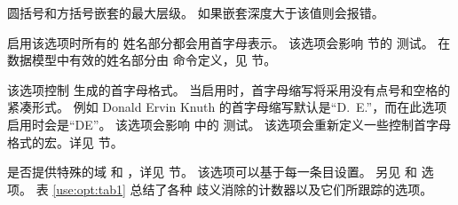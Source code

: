 \begin{optionlist}

圆括号和方括号嵌套的最大层级。
如果嵌套深度大于该值则会报错。



启用该选项时所有的  姓名部分都会用首字母表示。
该选项会影响  节的  测试。
在数据模型中有效的姓名部分由  命令定义，见  节。



该选项控制 \biblatex 生成的首字母格式。
当启用时，首字母缩写将采用没有点号和空格的紧凑形式。
例如 Donald Ervin Knuth 的首字母缩写默认是“D.~E.”，而在此选项启用时会是“DE”。
该选项会影响  中的  测试。
该选项会重新定义一些控制首字母格式的宏。详见  节。



是否提供特殊的域  和 ，详见  节。
该选项可以基于每一条目设置。
另见  和  选项。
表 \ref{use:opt:tab1} 总结了各种  歧义消除的计数器以及它们所跟踪的选项。


\end{optionlist}

